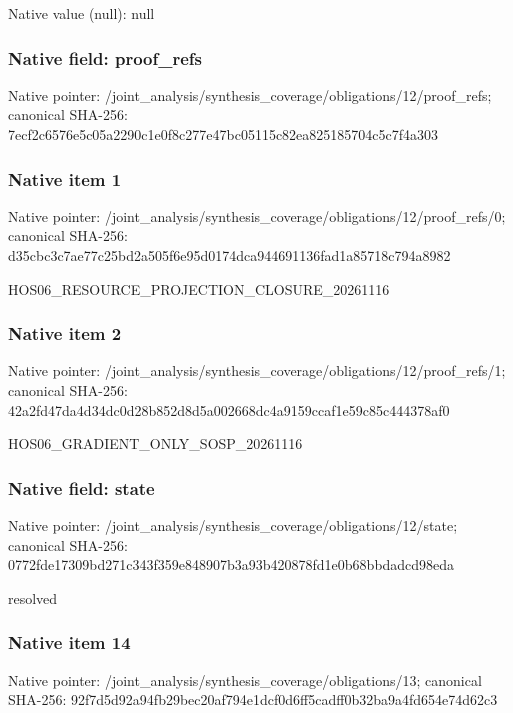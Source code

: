 \documentclass[10pt,a4paper]{article}
\begin{document}
Native value (null): null

\subsubsection{Native field: proof\_\allowbreak{}refs}
Native pointer: /joint\_\allowbreak{}analysis/synthesis\_\allowbreak{}coverage/obligations/12/proof\_\allowbreak{}refs; canonical SHA-256: 7ecf2c6576e5c05a2290c1e0f8c277e47bc05115c82ea825185704c5c7f4a303

\subsubsection{Native item 1}
Native pointer: /joint\_\allowbreak{}analysis/synthesis\_\allowbreak{}coverage/obligations/12/proof\_\allowbreak{}refs/0; canonical SHA-256: d35cbc3c7ae77c25bd2a505f6e95d0174dca944691136fad1a85718c794a8982

\begingroup\raggedright\sloppy HOS06\_\allowbreak{}RESOURCE\_\allowbreak{}PROJECTION\_\allowbreak{}CLOSURE\_\allowbreak{}20261116\par\endgroup

\subsubsection{Native item 2}
Native pointer: /joint\_\allowbreak{}analysis/synthesis\_\allowbreak{}coverage/obligations/12/proof\_\allowbreak{}refs/1; canonical SHA-256: 42a2fd47da4d34dc0d28b852d8d5a002668dc4a9159ccaf1e59c85c444378af0

\begingroup\raggedright\sloppy HOS06\_\allowbreak{}GRADIENT\_\allowbreak{}ONLY\_\allowbreak{}SOSP\_\allowbreak{}20261116\par\endgroup

\subsubsection{Native field: state}
Native pointer: /joint\_\allowbreak{}analysis/synthesis\_\allowbreak{}coverage/obligations/12/state; canonical SHA-256: 0772fde17309bd271c343f359e848907b3a93b420878fd1e0b68bbdadcd98eda

\begingroup\raggedright\sloppy resolved\par\endgroup

\subsubsection{Native item 14}
Native pointer: /joint\_\allowbreak{}analysis/synthesis\_\allowbreak{}coverage/obligations/13; canonical SHA-256: 92f7d5d92a94fb29bec20af794e1dcf0d6ff5cadff0b32ba9a4fd654e74d62c3
\end{document}
